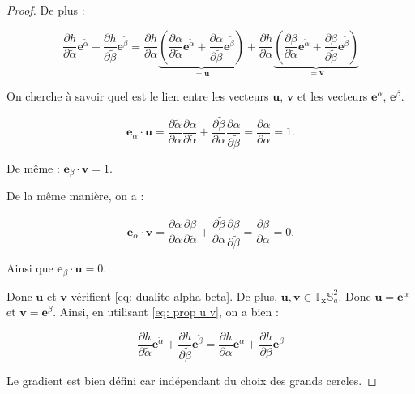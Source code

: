 \begin{proof}
De plus :

\begin{equation}
\dfrac{\partial h}{\partial \tilde{\alpha}} \mathbf{e}^{\tilde{\alpha}} + \dfrac{\partial h}{\partial \tilde{\beta}} \mathbf{e}^{\tilde{\beta}} = \dfrac{\partial h}{\partial \alpha}  \underbrace{\left( \dfrac{\partial \alpha}{\partial \tilde{\alpha}} \mathbf{e}^{\tilde{\alpha}} + \dfrac{\partial \alpha}{\partial \tilde{\beta}} \mathbf{e}^{\tilde{\beta}}  \right)} _{=\mathbf{u}} + \dfrac{\partial h}{\partial \alpha}  \underbrace{\left( \dfrac{\partial \beta}{\partial \tilde{\alpha}} \mathbf{e}^{\tilde{\alpha}} + \dfrac{\partial \beta}{\partial \tilde{\beta}} \mathbf{e}^{\tilde{\beta}} \right)}_{= \mathbf{v}} 
\label{eq: prop u v}
\end{equation}

On cherche à savoir quel est le lien entre les vecteurs $\mathbf{u}$, $\mathbf{v}$ et les vecteurs $\mathbf{e}^{\alpha}$, $\mathbf{e}^{\beta}$.

\begin{equation}
\mathbf{e}_{\alpha} \cdot \mathbf{u} = \dfrac{\partial \tilde{\alpha}}{\partial \alpha} \dfrac{\partial \alpha}{\partial \tilde{\alpha}} + \dfrac{\partial \tilde{\beta}}{\partial \alpha} \dfrac{\partial \alpha}{\partial \tilde{\beta}} = \dfrac{\partial \alpha}{\partial \alpha} = 1.
\end{equation}

De même : $\mathbf{e}_{\beta} \cdot \mathbf{v} = 1$.

De la même manière, on a :

\begin{equation}
\mathbf{e}_{\alpha} \cdot \mathbf{v} = \dfrac{\partial \tilde{\alpha}}{\partial \alpha} \dfrac{\partial \beta}{\partial \tilde{\alpha}} + \dfrac{\partial \tilde{\beta}}{\partial \alpha} \dfrac{\partial \beta}{\partial \tilde{\beta}} = \dfrac{\partial \beta}{\partial \alpha} = 0.
\end{equation}

Ainsi que $\mathbf{e}_{\beta} \cdot \mathbf{u} = 0$.

Donc $\mathbf{u}$ et $\mathbf{v}$ vérifient \eqref{eq: dualite alpha beta}. De plus, $\mathbf{u}, \mathbf{v} \in \mathbb{T}_{\mathbf{x}} \mathbb{S}_a^2$. Donc $\mathbf{u} = \mathbf{e}^{\alpha}$ et $\mathbf{v} = \mathbf{e}^{\beta}$. Ainsi, en utilisant \eqref{eq: prop u v}, on a bien :

\begin{equation}
\dfrac{\partial h}{\partial \tilde{\alpha}} \mathbf{e}^{\tilde{\alpha}} + \dfrac{\partial h}{\partial \tilde{\beta}} \mathbf{e}^{\tilde{\beta}} = \dfrac{\partial h}{\partial \alpha} \mathbf{e}^{\alpha} + \dfrac{\partial h}{\partial \beta} \mathbf{e}^{\beta}
\end{equation}

Le gradient est bien défini car indépendant du choix des grands cercles.
\end{proof}



